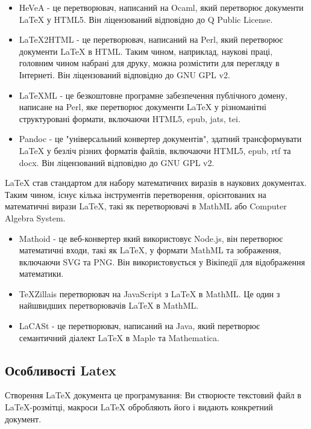 	\begin{itemize}
		\item HeVeA - це перетворювач, написаний на Ocaml, який перетворює документи LaTeX у HTML5. Він ліцензований відповідно до Q Public License.
		
		\item LaTeX2HTML - це перетворювач, написаний на Perl, який перетворює документи LaTeX в HTML. Таким чином, наприклад, наукові праці, головним чином набрані для друку, можна розмістити для перегляду в Інтернеті. Він ліцензований відповідно до GNU GPL v2.
		
		\item LaTeXML - це безкоштовне програмне забезпечення публічного домену, написане на Perl, яке перетворює документи LaTeX у різноманітні структуровані формати, включаючи HTML5, epub, jats, tei.
		\item Pandoc - це "універсальний конвертер документів", здатний трансформувати LaTeX у безліч різних форматів файлів, включаючи HTML5, epub, rtf та docx. Він ліцензований відповідно до GNU GPL v2.
	
	\end{itemize}

	LaTeX став стандартом для набору математичних виразів в наукових документах. Таким чином, існує кілька інструментів перетворення, орієнтованих на математичні вирази LaTeX, такі як перетворювачі в MathML  або Computer Algebra System.
	
	\begin{itemize}
		\item  Mathoid - це веб-конвертер який використовує Node.js, він перетворює математичні входи, такі як LaTeX, у формати MathML та зображення, включаючи SVG та PNG. Він використовується у Вікіпедії для відображення математики.
		\item TeXZillais перетворювач на JavaScript з LaTeX в MathML. Це один з найшвидших перетворювачів LaTeX в MathML.
		\item  LaCASt - це перетворювач, написаний на Java, який перетворює семантичний діалект LaTeX в Maple та Mathematica.
	\end{itemize}


	\subsection{Особливості Latex}
	
	Створення LaTeX документа це програмування: Ви створюєте текстовий файл в LaTeX-розмітці, макроси LaTeX обробляють його і видають конкретний документ.
	
